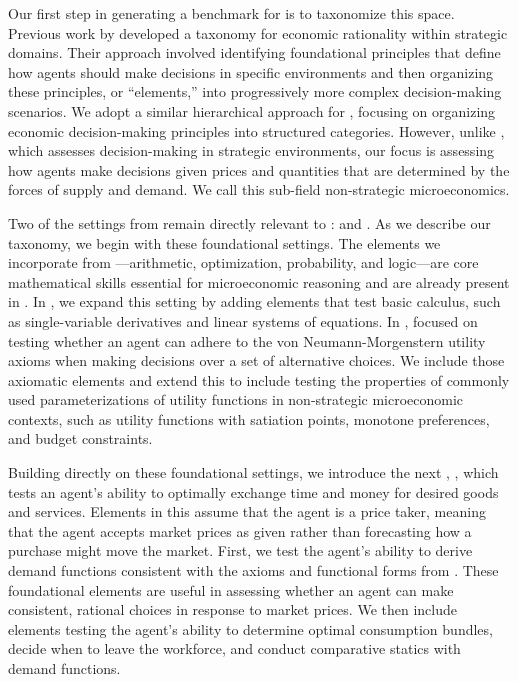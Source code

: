 Our first step in generating a benchmark for \economicDomain is to taxonomize this space. Previous work by \citet{ramansteer} developed a taxonomy for economic rationality within strategic domains. Their approach involved identifying foundational principles that define how agents should make decisions in specific environments and then organizing these principles, or ``elements,'' into progressively more complex decision-making scenarios. We adopt a similar hierarchical approach for \benchmark, focusing on organizing economic decision-making principles into structured categories. However, unlike \steer, which assesses decision-making in strategic environments, our focus is assessing how agents make decisions given prices and quantities that are determined by the forces of supply and demand. We call this sub-field non-strategic microeconomics.

Two of the settings from \steer remain directly relevant to \economicDomain: \firstParent and \secondParent. As we describe our taxonomy, we begin with these foundational settings. The elements we incorporate from \firstParent---arithmetic, optimization, probability, and logic---are core mathematical skills essential for microeconomic reasoning and are already present in \steer. In \benchmark, we expand this setting by adding elements that test basic calculus, such as single-variable derivatives and linear systems of equations. In \steer, \secondParent focused on testing whether an agent can adhere to the von Neumann-Morgenstern utility axioms when making decisions over a set of alternative choices. We include those axiomatic elements and extend this \parent to include testing the properties of commonly used parameterizations of utility functions in non-strategic microeconomic contexts, such as utility functions with satiation points, monotone preferences, and budget constraints.


Building directly on these foundational settings, we introduce the next \parent, \fifthParent, which tests an agent's ability to optimally exchange time and money for desired goods and services. Elements in this \parent assume that the agent is a price taker, meaning that the agent accepts market prices as given rather than forecasting how a purchase
might move the market. First, we test the agent's ability to derive demand functions consistent with the axioms and functional forms from \secondParent. These foundational elements are useful in assessing whether an agent can make consistent, rational choices in response to market prices. We then include elements testing the agent's ability to determine optimal consumption bundles, decide when to leave the workforce, and conduct comparative statics with demand functions.

